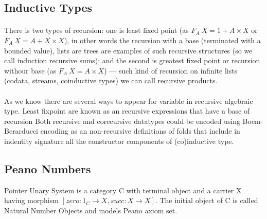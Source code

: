 \documentclass[11pt,oneside]{article}
\begin{document}
\begingroup
\parbox[t][][l]{0.40\textwidth}{

\begin{prooftree}
\end{prooftree}

\begin{prooftree}
\end{prooftree}

}
\hspace{0.1cm}
\parbox[t][][r]{0.60\textwidth}{


\begin{prooftree}
\end{prooftree}

}
\endgroup

\newpage
   \subsection{Inductive Types}

  \paragraph{}
  There is two types of recursion: one is least fixed point (as $F_A\ X = 1 + A\times X$ or $F_A\ X = A + X\times X$),
  in other words the recursion with a base (terminated with a bounded value), lists are trees are
  examples of such recursive structures (so we call induction recursive sums); and the second
  is greatest fixed point or recursion withour base (as $F_A\ X = A\times X $) --- such kind of
  recursion on infinite lists (codata, streams, coinductive types) we can call recursive products.

  \paragraph{}
  As we know there are several ways to appear for variable in recursive algebraic type.
  Least fixpoint are known as an recursive expressions that have a base of recursion
  Both recursive and corecursive datatypes could be encoded using Boem-Berarducci encoding
  as an non-recursive definitions of folds that include in indentity signature all the
  constructor components of (co)inductive type.

  \subsection{Peano Numbers}
  Pointer Unary System is a category C with terminal object
  and a carrier X having morphism $[zero: 1_C \rightarrow X,succ: X \rightarrow X]$.
  The initial object of C is called Natural Number Objects and models Peano axiom set.
\end{document}
